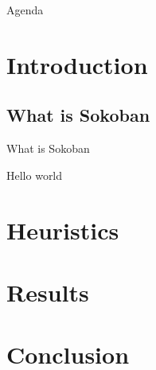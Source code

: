 
\begin{frame}[t,plain]
\titlepage
\end{frame}

\begin{frame}{Agenda}
\tableofcontents
\end{frame}



\section{Introduction}

\subsection{What is Sokoban}
\begin{frame}{What is Sokoban}
\begin{center}
  Hello world
\end{center}
\end{frame}




\section{Heuristics}
% 

\section{Results}


\section{Conclusion}
